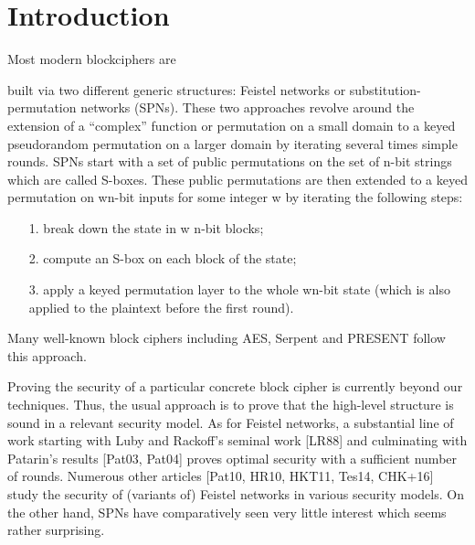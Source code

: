 
\section{Introduction}
\label{section:Introduction}


Most modern blockciphers are

built via two different generic structures: Feistel networks or substitution-permutation
networks (SPNs). These two approaches revolve around the extension of a ``complex'' function or permutation on a small domain to a keyed pseudorandom
permutation on a larger domain by iterating several times simple rounds.
SPNs start with a set of public permutations on the set of n-bit strings which
are called S-boxes. These public permutations are then extended to a keyed
permutation on wn-bit inputs for some integer w by iterating the following steps:
\begin{enumerate}
	\item[1.] break down the state in w n-bit blocks;
	\item[2.] compute an S-box on each block of the state;
	\item[3.] apply a keyed permutation layer to the whole wn-bit state (which is also applied to the plaintext before the first round).
\end{enumerate}


Many well-known block ciphers including AES, Serpent and PRESENT follow
this approach.


Proving the security of a particular concrete block cipher is
currently beyond our techniques. Thus, the usual approach is to prove that the
high-level structure is sound in a relevant security model. As for Feistel networks,
a substantial line of work starting with Luby and Rackoff's seminal work [LR88]
and culminating with Patarin's results [Pat03, Pat04] proves optimal security with
a sufficient number of rounds. Numerous other articles [Pat10, HR10, HKT11,
Tes14, CHK+16] study the security of (variants of) Feistel networks in various
security models. On the other hand, SPNs have comparatively seen very little
interest which seems rather surprising.





